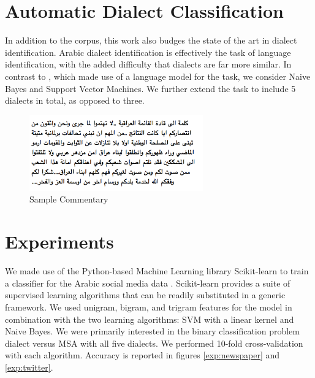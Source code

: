 \documentclass[10pt, a4paper]{article}
\begin{document}
\section{Automatic Dialect Classification}\label{classification} In
addition to the corpus, this work also budges the state of the art in
dialect identification.  Arabic dialect identification is effectively
the task of language identification, with the added difficulty that
dialects are far more similar.  In contrast to \cite{zaidan2011arabic}
, which made use of a language model for the task, we consider Naive
Bayes and Support Vector Machines. We
further extend the task to include 5 dialects in total, as opposed to
three.



\begin{figure}
\centering
  \includegraphics[width=75mm]{figs/arabictext2.png}	
\caption{Sample Commentary}
\end{figure} 





\section{Experiments}\label{sec:experiments}
We made use of the Python-based Machine Learning library Scikit-learn
to train a classifier for the Arabic social media data
\cite{pedregosa2011scikit}. Scikit-learn provides a suite of
supervised learning algorithms that can be readily substituted in a
generic framework. We used unigram, bigram, and trigram features for
the model in combination with the two learning algorithms: SVM with a
linear kernel and Naive Bayes. We were primarily interested in the
binary classification problem dialect versus MSA with all 
five dialects. We performed 10-fold
cross-validation with each algorithm.  Accuracy is reported in figures
\ref{exp:newspaper} and \ref{exp:twitter}.
\end{document}
